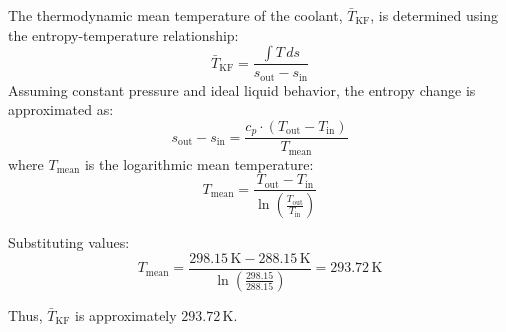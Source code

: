 The thermodynamic mean temperature of the coolant, \( \bar{T}_{\text{KF}} \), is determined using the entropy-temperature relationship:  
\[
\bar{T}_{\text{KF}} = \frac{\int T \, ds}{s_{\text{out}} - s_{\text{in}}}
\]  
Assuming constant pressure and ideal liquid behavior, the entropy change is approximated as:  
\[
s_{\text{out}} - s_{\text{in}} = \frac{c_p \cdot (T_{\text{out}} - T_{\text{in}})}{T_{\text{mean}}}
\]  
where \( T_{\text{mean}} \) is the logarithmic mean temperature:  
\[
T_{\text{mean}} = \frac{T_{\text{out}} - T_{\text{in}}}{\ln\left(\frac{T_{\text{out}}}{T_{\text{in}}}\right)}
\]  

Substituting values:  
\[
T_{\text{mean}} = \frac{298.15 \, \text{K} - 288.15 \, \text{K}}{\ln\left(\frac{298.15}{288.15}\right)} = 293.72 \, \text{K}
\]  

Thus, \( \bar{T}_{\text{KF}} \) is approximately \( 293.72 \, \text{K} \).